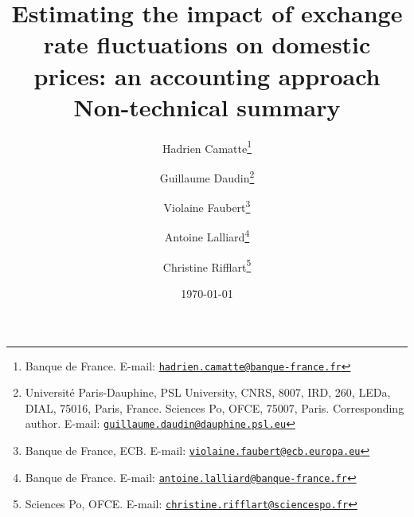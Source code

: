 \documentclass[11pt,a4paper]{article}
\newcommand{\email}[1]{\href{mailto:#1}{\nolinkurl{#1}}}
\begin{document}
\title{Estimating the impact of exchange rate fluctuations on domestic prices: an accounting approach \\ Non-technical summary
\vspace{1cm}
}
\vspace{1cm}
\date{\today}
\author{
	Hadrien Camatte\thanks{Banque de France. E-mail: \email{hadrien.camatte@banque-france.fr}}
	\and
	Guillaume Daudin\thanks{Université Paris-Dauphine, PSL University, CNRS, 8007, IRD, 260, LEDa, DIAL, 75016, Paris, France. Sciences Po, OFCE, 75007, Paris. Corresponding author. E-mail: \email{guillaume.daudin@dauphine.psl.eu}}
	\and
	Violaine Faubert\thanks{Banque de France, ECB. E-mail: \email{violaine.faubert@ecb.europa.eu}}
	\and
	Antoine Lalliard\thanks{Banque de France. E-mail: \email{antoine.lalliard@banque-france.fr}}
	\and
	Christine Rifflart\thanks{Sciences Po, OFCE. E-mail: \email{christine.rifflart@sciencespo.fr}}
}
\maketitle
\end{document}

